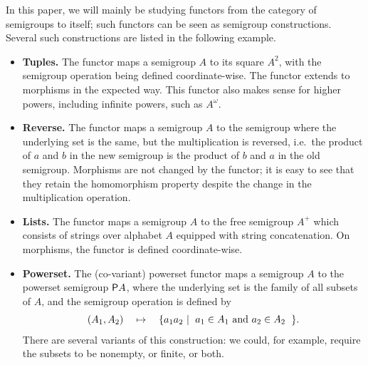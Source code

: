  \begin{myexample}\label{ex:functors}
    In this paper, we will mainly be studying functors from the category of semigroups to itself; such functors can be seen as semigroup constructions.  Several such constructions are listed in the following example. 
    \begin{itemize}
        \item {\bf Tuples.} The functor maps a semigroup $A$ to its square $A^2$, with the semigroup operation being defined coordinate-wise. The functor extends to morphisms in the expected way. This functor also makes sense for higher powers, including infinite powers, such as $A^\omega$.
        \item {\bf Reverse. } The functor maps a semigroup $A$ to the semigroup where the underlying set is the same, but the multiplication is reversed, i.e.~the product of $a$ and $b$ in the new semigroup is the product of $b$ and $a$ in the old semigroup. Morphisms are not changed by the functor; it is easy to see that they retain the homomorphism property despite the change in the multiplication operation.
        \item {\bf Lists.} The functor maps a semigroup $A$ to the free semigroup $A^+$ which consists of strings over alphabet $A$  equipped with string concatenation. On morphisms, the functor is defined coordinate-wise. 
        \item {\bf Powerset.} The (co-variant) powerset functor maps a semigroup $A$ to the powerset semigroup $\mathsf P A$, where the underlying set is the family of all subsets of $A$, and the semigroup operation is defined by 
        \begin{align*}
        (A_1,A_2) \quad \mapsto \quad \setbuild{a_1 a_2}{$a_1 \in A_1$ and $a_2 \in A_2$}.
        \end{align*}
        There are several variants of this construction: we could, for example,  require the subsets to be nonempty, or finite, or both.
    \end{itemize}
 \end{myexample}

